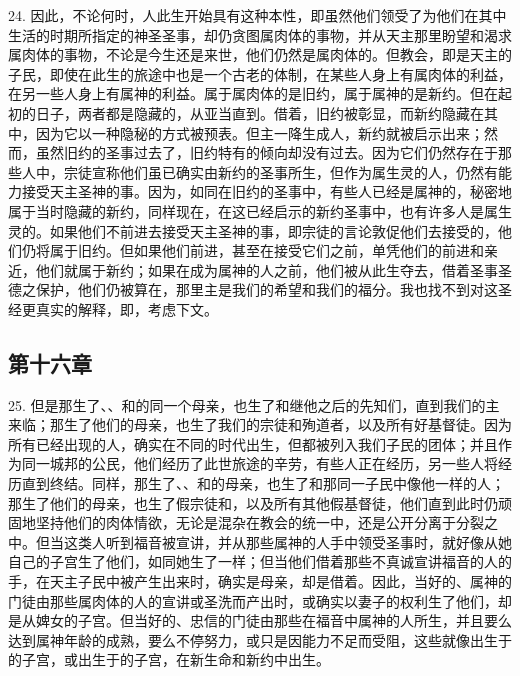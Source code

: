24. 因此，不论何时，人此生开始具有这种本性，即虽然他们领受了为他们在其中生活的时期所指定的神圣圣事，却仍贪图属肉体的事物，并从天主那里盼望和渴求属肉体的事物，不论是今生还是来世，他们仍然是属肉体的。但教会，即是天主的子民，即使在此生的旅途中也是一个古老的体制，在某些人身上有属肉体的利益，在另一些人身上有属神的利益。属于属肉体的是旧约，属于属神的是新约。但在起初的日子，两者都是隐藏的，从亚当直到。借着，旧约被彰显，而新约隐藏在其中，因为它以一种隐秘的方式被预表。但主一降生成人，新约就被启示出来；然而，虽然旧约的圣事过去了，旧约特有的倾向却没有过去。因为它们仍然存在于那些人中，宗徒宣称他们虽已确实由新约的圣事所生，但作为属生灵的人，仍然有能力接受天主圣神的事。因为，如同在旧约的圣事中，有些人已经是属神的，秘密地属于当时隐藏的新约，同样现在，在这已经启示的新约圣事中，也有许多人是属生灵的。如果他们不前进去接受天主圣神的事，即宗徒的言论敦促他们去接受的，他们仍将属于旧约。但如果他们前进，甚至在接受它们之前，单凭他们的前进和亲近，他们就属于新约；如果在成为属神的人之前，他们被从此生夺去，借着圣事圣德之保护，他们仍被算在，那里主是我们的希望和我们的福分。我也找不到对这圣经更真实的解释，即，考虑下文。\par


\subsection{第十六章}

25. 但是那生了、、和的同一个母亲，也生了和继他之后的先知们，直到我们的主来临；那生了他们的母亲，也生了我们的宗徒和殉道者，以及所有好基督徒。因为所有已经出现的人，确实在不同的时代出生，但都被列入我们子民的团体；并且作为同一城邦的公民，他们经历了此世旅途的辛劳，有些人正在经历，另一些人将经历直到终结。同样，那生了、、和的母亲，也生了和那同一子民中像他一样的人；那生了他们的母亲，也生了假宗徒和，以及所有其他假基督徒，他们直到此时仍顽固地坚持他们的肉体情欲，无论是混杂在教会的统一中，还是公开分离于分裂之中。但当这类人听到福音被宣讲，并从那些属神的人手中领受圣事时，就好像从她自己的子宫生了他们，如同她生了一样；但当他们借着那些不真诚宣讲福音的人的手，在天主子民中被产生出来时，确实是母亲，却是借着。因此，当好的、属神的门徒由那些属肉体的人的宣讲或圣洗而产出时，或确实以妻子的权利生了他们，却是从婢女的子宫。但当好的、忠信的门徒由那些在福音中属神的人所生，并且要么达到属神年龄的成熟，要么不停努力，或只是因能力不足而受阻，这些就像出生于的子宫，或出生于的子宫，在新生命和新约中出生。\par

